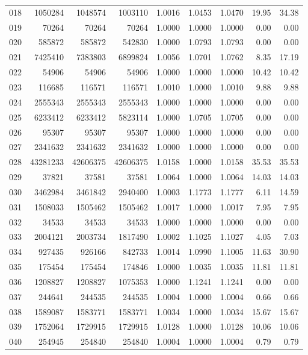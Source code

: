 \begin{longtable}{crrrrrrrr}
018 & 1050284 & 1048574 & 1003110 & 1.0016 & 1.0453 & 1.0470 & 19.95 & 34.38 \\
019 & 70264 & 70264 & 70264 & 1.0000 & 1.0000 & 1.0000 & 0.00 & 0.00 \\
020 & 585872 & 585872 & 542830 & 1.0000 & 1.0793 & 1.0793 & 0.00 & 0.00 \\
021 & 7425410 & 7383803 & 6899824 & 1.0056 & 1.0701 & 1.0762 & 8.35 & 17.19 \\
022 & 54906 & 54906 & 54906 & 1.0000 & 1.0000 & 1.0000 & 10.42 & 10.42 \\
023 & 116685 & 116571 & 116571 & 1.0010 & 1.0000 & 1.0010 & 9.88 & 9.88 \\
024 & 2555343 & 2555343 & 2555343 & 1.0000 & 1.0000 & 1.0000 & 0.00 & 0.00 \\
025 & 6233412 & 6233412 & 5823114 & 1.0000 & 1.0705 & 1.0705 & 0.00 & 0.00 \\
026 & 95307 & 95307 & 95307 & 1.0000 & 1.0000 & 1.0000 & 0.00 & 0.00 \\
027 & 2341632 & 2341632 & 2341632 & 1.0000 & 1.0000 & 1.0000 & 0.00 & 0.00 \\
028 & 43281233 & 42606375 & 42606375 & 1.0158 & 1.0000 & 1.0158 & 35.53 & 35.53 \\
029 & 37821 & 37581 & 37581 & 1.0064 & 1.0000 & 1.0064 & 14.03 & 14.03 \\
030 & 3462984 & 3461842 & 2940400 & 1.0003 & 1.1773 & 1.1777 & 6.11 & 14.59 \\
031 & 1508033 & 1505462 & 1505462 & 1.0017 & 1.0000 & 1.0017 & 7.95 & 7.95 \\
032 & 34533 & 34533 & 34533 & 1.0000 & 1.0000 & 1.0000 & 0.00 & 0.00 \\
033 & 2004121 & 2003734 & 1817490 & 1.0002 & 1.1025 & 1.1027 & 4.05 & 7.03 \\
034 & 927435 & 926166 & 842733 & 1.0014 & 1.0990 & 1.1005 & 11.63 & 30.90 \\
035 & 175454 & 175454 & 174846 & 1.0000 & 1.0035 & 1.0035 & 11.81 & 11.81 \\
036 & 1208827 & 1208827 & 1075353 & 1.0000 & 1.1241 & 1.1241 & 0.00 & 0.00 \\
037 & 244641 & 244535 & 244535 & 1.0004 & 1.0000 & 1.0004 & 0.66 & 0.66 \\
038 & 1589087 & 1583771 & 1583771 & 1.0034 & 1.0000 & 1.0034 & 15.67 & 15.67 \\
039 & 1752064 & 1729915 & 1729915 & 1.0128 & 1.0000 & 1.0128 & 10.06 & 10.06 \\
040 & 254945 & 254840 & 254840 & 1.0004 & 1.0000 & 1.0004 & 0.79 & 0.79 \\

\end{longtable}
